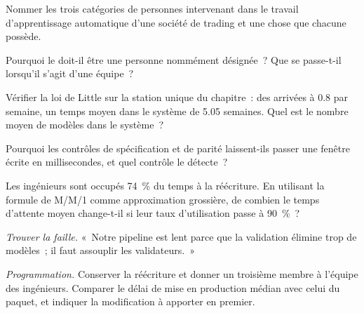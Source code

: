 \begin{exercise}[$\star$]\label{exo:ml:the-machine-learning-team:1}
Nommer les trois catégories de personnes intervenant dans le travail d'apprentissage automatique d'une société de trading et une chose que chacune possède.
\end{exercise}

\begin{exercise}[$\star$]\label{exo:ml:the-machine-learning-team:2}
Pourquoi le  doit-il être une personne nommément désignée~? Que se passe-t-il lorsqu'il s'agit d'une équipe~?
\end{exercise}

\begin{exercise}[$\star$]\label{exo:ml:the-machine-learning-team:3}
Vérifier la loi de Little sur la station unique du chapitre~: des arrivées à 0.8 par semaine, un temps moyen dans le système de 5.05 semaines. Quel est le
nombre moyen de modèles dans le système~?
\end{exercise}

\begin{exercise}[$\star\star$]\label{exo:ml:the-machine-learning-team:4}
Pourquoi les contrôles de spécification et de parité laissent-ils passer une fenêtre écrite en millisecondes, et quel contrôle le détecte~?
\end{exercise}

\begin{exercise}[$\star\star$]\label{exo:ml:the-machine-learning-team:5}
Les ingénieurs sont occupés 74~\% du temps à la réécriture. En utilisant la formule de M/M/1 comme approximation grossière, de combien le temps
d'attente moyen change-t-il si leur taux d'utilisation passe à 90~\%~?
\end{exercise}

\begin{exercise}[$\star\star$]\label{exo:ml:the-machine-learning-team:6}
\emph{Trouver la faille.} «~Notre pipeline est lent parce que la validation élimine trop de modèles~; il faut assouplir les validateurs.~»
\end{exercise}

\begin{exercise}[$\star\star\star$]\label{exo:ml:the-machine-learning-team:7}
\emph{Programmation.} Conserver la réécriture et donner un troisième membre à l'équipe des ingénieurs. Comparer le délai de mise en production médian avec celui du paquet, et
indiquer la modification à apporter en premier.
\end{exercise}

